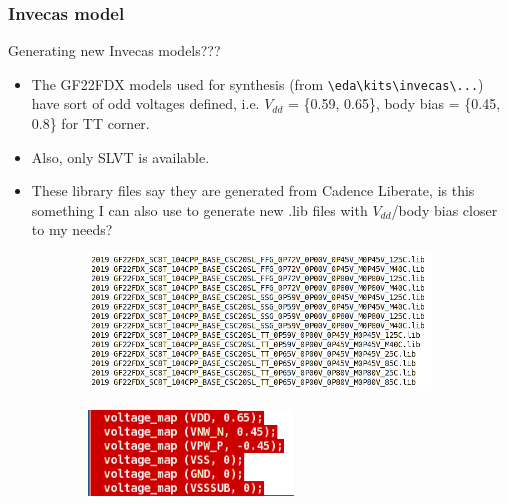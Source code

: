 \documentclass[t, screen, aspectratio=43]{beamer}
\begin{document}
\begin{frame}
	\frametitle{Invecas model}
	\begin{block}{Generating new Invecas models???}
	\tiny
	\begin{itemize}[itemsep=4pt,label=\protect---]
		\item The GF22FDX models used for synthesis (from \texttt{\textbackslash eda\textbackslash kits\textbackslash invecas\textbackslash ...}) have sort of odd voltages defined, i.e. $V_{dd}$ = \{0.59, 0.65\}, body bias = \{0.45, 0.8\} for TT corner. 
		\item Also, only SLVT is available.
		\item These library files say they are generated from Cadence Liberate, is this something I can also use to generate new .lib files with $V_{dd}$/body bias closer to my needs?
	\end{itemize}

	\end{block}	

	\begin{figure}[htb!]
	    \centering
	    \begin{subfigure}{0.6\textwidth}
	        \centering
	        \includegraphics[width=1\textwidth, angle=0]{invecas_model_names.png}
	    \end{subfigure}%
	    \begin{subfigure}{0.4\textwidth}
	        \centering
	        \includegraphics[width=0.6\textwidth, angle=0]{invecas_model.png}
	    \end{subfigure}
	\end{figure}

\end{frame}
\end{document}
